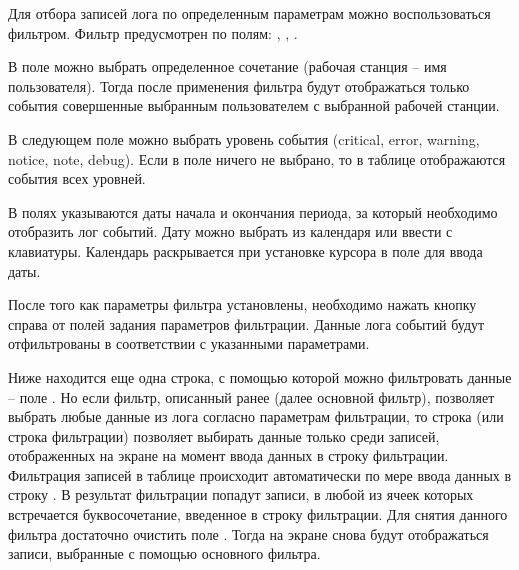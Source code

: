 Для отбора записей лога по определенным параметрам можно воспользоваться фильтром. Фильтр предусмотрен по полям: , , .

В поле  можно выбрать определенное сочетание (рабочая станция – имя пользователя). Тогда после применения фильтра будут отображаться только события совершенные выбранным пользователем с выбранной рабочей станции.

В следующем поле можно выбрать уровень события (critical, error, warning, notice, note, debug). Если в поле ничего не выбрано, то в таблице отображаются события всех уровней.

В полях   указываются даты начала и окончания периода, за который необходимо отобразить лог событий. Дату можно выбрать из календаря или ввести с клавиатуры. Календарь раскрывается при установке курсора в поле для ввода даты.

После того как параметры фильтра установлены, необходимо нажать кнопку  справа от полей задания параметров фильтрации. Данные лога событий будут отфильтрованы в соответствии с указанными параметрами.

Ниже находится еще одна строка, с помощью которой можно фильтровать данные – поле . Но если фильтр, описанный ранее (далее основной фильтр), позволяет выбрать любые данные из лога согласно параметрам фильтрации, то строка  (или строка фильтрации) позволяет выбирать данные только среди записей, отображенных на экране на момент ввода данных в строку фильтрации. Фильтрация записей в таблице происходит автоматически по мере ввода данных в строку . В результат фильтрации попадут записи, в любой из ячеек которых встречается буквосочетание, введенное в строку фильтрации. Для снятия данного фильтра достаточно очистить поле . Тогда на экране снова будут отображаться записи, выбранные с помощью основного фильтра.
